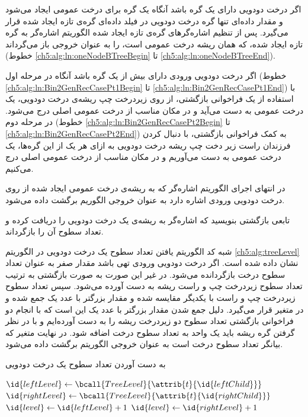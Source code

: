 اگر درخت دودویی دارای یک گره باشد آنگاه یک گره برای درخت عمومی ایجاد می‌شود و مقدار داده‌ای تنها گره درخت دودویی در فیلد داده‌ای گره‌ی تازه ایجاد شده قرار می‌گیرد. پس از تنظیم اشاره‌گرهای گره‌ی تازه ایجاد شده الگوریتم {} اشاره‌گر به گره تازه ایجاد شده، که همان ریشه درخت عمومی است، را به عنوان خروجی باز می‌گرداند (خطوط {\ref{ch5:alg:ln:oneNodeBTreeBegin}} تا {\ref{ch5:alg:ln:oneNodeBTreeEnd}}).

اگر درخت دودویی ورودی دارای بیش از یک گره باشد آنگاه در مرحله اول (خطوط {\ref{ch5:alg:ln:Bin2GenRecCasePt1Begin}} تا {\ref{ch5:alg:ln:Bin2GenRecCasePt1End}}) با استفاده از یک فراخوانی بازگشتی، از روی زیردرخت چپ ریشه‌ی درخت دودویی، یک درخت عمومی به دست می‌آید و در مکان مناسب از درخت عمومی اصلی درج می‌شود. در مرحله دوم (خطوط {\ref{ch5:alg:ln:Bin2GenRecCasePt2Begin}} تا {\ref{ch5:alg:ln:Bin2GenRecCasePt2End}}) به کمک فراخوانی بازگشتی، با دنبال کردن فرزندان راست زیر دخت چپ ریشه درخت دودویی به ازای هر یک از این گره‌ها، یک درخت عمومی به دست می‌آوریم و در مکان مناسب از درخت عمومی اصلی درج می‌کنیم.

در انتهای اجرای الگوریتم اشاره‌گر {} که به ریشه‌ی درخت عمومی ایجاد شده از روی درخت دودویی ورودی اشاره دارد به عنوان خروجی الگوریم برگشت داده می‌شود.

 تابعی بازگشتی بنویسید که اشاره‌گر به ریشه‌ی یک درخت دودویی را دریافت کرده و تعداد سطوح آن را بازگرداند.


شبه کد الگوریتم یافتن تعداد سطوح یک درخت دودویی در الگوریتم {\eqref{ch5:alg:treeLevel}} نشان داده شده است. اگر درخت دودویی ورودی تهی باشد مقدار صفر به عنوان تعداد سطوح درخت بازگردانده می‌شود. در غیر این صورت به صورت بازگشتی به ترتیب تعداد سطوح زیردرخت چپ و راست ریشه به دست آورده می‌شود. سپس تعداد سطوح زیردرخت چپ و راست با یکدیگر مقایسه شده و مقدار بزرگتر با عدد یک جمع شده و در متغیر {} قرار می‌گیرد. دلیل جمع شدن مقدار بزرگتر با عدد یک این است که با انجام دو فراخوانی‌ بازگشتی تعداد سطوح دو زیردرخت ریشه را به دست آورده‌ایم و با در نظر گرفتن گره ریشه باید یک واحد به تعداد سطوح درخت اضافه شود. در نهایت متغیر {} که بیانگر تعداد سطوح درخت است به عنوان خروجی الگوریتم برگشت داده می‌شود.  

\begin{algorithm}
\caption{به دست آوردن تعداد سطوح یک درخت دودویی}\label{ch5:alg:treeLevel}
\begin{latin}
\begin{algorithmic}[1]
			\State	{}
		\EndIf
		\State	$\id{leftLevel} \gets \bcall{TreeLevel}{\attrib{t}{\id{leftChild}}}$
		\State	$\id{rightLevel} \gets \bcall{TreeLevel}{\attrib{t}{\id{rightChild}}}$			
			\State	$\id{level}\gets\id{leftLevel} + 1$
		\Else
			\State	$\id{level}\gets\id{rightLevel} + 1$
		\EndIf
		\State	\Return	{}
\EndFunction
\end{algorithmic}
\end{latin}
\end{algorithm}


